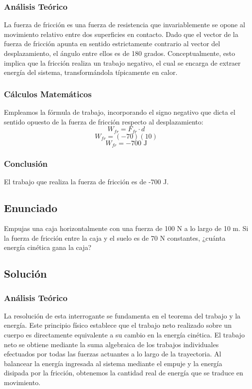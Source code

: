 \documentclass[a4paper,12pt]{article}
\begin{document}
\subsubsection*{Análisis Teórico}
La fuerza de fricción es una fuerza de resistencia que invariablemente se opone al movimiento relativo entre dos superficies en contacto. Dado que el vector de la fuerza de fricción apunta en sentido estrictamente contrario al vector del desplazamiento, el ángulo entre ellos es de 180 grados. Conceptualmente, esto implica que la fricción realiza un trabajo negativo, el cual se encarga de extraer energía del sistema, transformándola típicamente en calor.

\subsubsection*{Cálculos Matemáticos}
Empleamos la fórmula de trabajo, incorporando el signo negativo que dicta el sentido opuesto de la fuerza de fricción respecto al desplazamiento:
$$W_{fr}=F_{fr}\cdot d$$
$$W_{fr}=(-70)(10)$$
$$W_{fr}=-700\text{ J}$$

\subsubsection*{Conclusión}
El trabajo que realiza la fuerza de fricción es de -700 J.


\subsection*{Enunciado}
Empujas una caja horizontalmente con una fuerza de 100 N a lo largo de 10 m. Si la fuerza de fricción entre la caja y el suelo es de 70 N constantes, ¿cuánta energía cinética gana la caja?

\subsection*{Solución}
\subsubsection*{Análisis Teórico}
La resolución de esta interrogante se fundamenta en el teorema del trabajo y la energía. Este principio físico establece que el trabajo neto realizado sobre un cuerpo es directamente equivalente a su cambio en la energía cinética. El trabajo neto se obtiene mediante la suma algebraica de los trabajos individuales efectuados por todas las fuerzas actuantes a lo largo de la trayectoria. Al balancear la energía ingresada al sistema mediante el empuje y la energía disipada por la fricción, obtenemos la cantidad real de energía que se traduce en movimiento.
\end{document}
